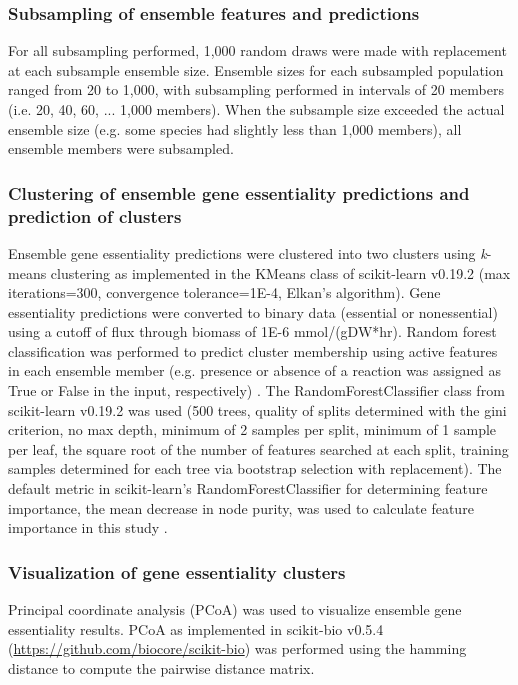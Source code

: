 \documentclass[11pt,twocolumn,notitlepage,openany,twoside]{book}
\begin{document}
\begin{refsection}
\subsubsection{Subsampling of ensemble features and predictions}

For all subsampling performed, 1,000 random draws were made with replacement at each subsample ensemble size. Ensemble sizes for each subsampled population ranged from 20 to 1,000, with subsampling performed in intervals of 20 members (i.e. 20, 40, 60, ... 1,000 members). When the subsample size exceeded the actual ensemble size (e.g. some species had slightly less than 1,000 members), all ensemble members were subsampled.

\subsubsection{Clustering of ensemble gene essentiality predictions and prediction of clusters}

Ensemble gene essentiality predictions were clustered into two clusters using \textit{k}-means clustering as implemented in the KMeans class of scikit-learn v0.19.2 \cite{Pedregosa2011-wa} (max iterations=300, convergence tolerance=1E-4, Elkan’s \cite{Elkan2003-du} algorithm). Gene essentiality predictions were converted to binary data (essential or nonessential) using a cutoff of flux through biomass of 1E-6 mmol/(gDW*hr). Random forest classification was performed to predict cluster membership using active features in each ensemble member (e.g. presence or absence of a reaction was assigned as True or False in the input, respectively) \cite{Breiman2001-pl}. The RandomForestClassifier class from scikit-learn v0.19.2 was used (500 trees, quality of splits determined with the gini criterion, no max depth, minimum of 2 samples per split, minimum of 1 sample per leaf, the square root of the number of features searched at each split, training samples determined for each tree via bootstrap selection with replacement). The default metric in scikit-learn’s RandomForestClassifier for determining feature importance, the mean decrease in node purity, was used to calculate feature importance in this study \cite{Gordon1984-iw}.

\subsubsection{Visualization of gene essentiality clusters}

Principal coordinate analysis (PCoA) \cite{Gower1966-xt} was used to visualize ensemble gene essentiality results. PCoA as implemented in scikit-bio v0.5.4 (\url{https://github.com/biocore/scikit-bio}) was performed using the hamming distance \cite{Hamming1950-zv} to compute the pairwise distance matrix.


\end{refsection}
\end{document}
